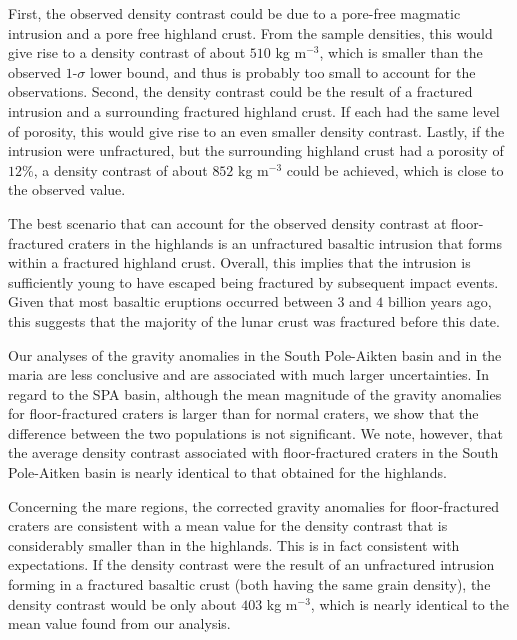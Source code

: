 First,  the observed  density contrast  could  be due  to a  pore-free
magmatic intrusion  and a  pore free highland  crust. From  the sample
densities, this would  give rise to a density contrast  of about $510$
kg m$^{-3}$,  which is  smaller than  the observed  $1$-$\sigma$ lower
bound, and thus is probably too small to account for the observations.
Second,  the density  contrast  could  be the  result  of a  fractured
intrusion and  a surrounding fractured  highland crust.  If  each had
the same  level of porosity, this  would give rise to  an even smaller
density contrast.  Lastly, if the  intrusion were unfractured, but the
surrounding  highland  crust  had  a porosity  of  $12\%$,  a  density
contrast of about $852$ kg m$^{-3}$  could be achieved, which is close
to the observed value.

The best scenario  that can account for the  observed density contrast
at floor-fractured craters in the highlands is an unfractured basaltic
intrusion that forms within a fractured highland crust.  Overall, this
implies that the intrusion is sufficiently young to have escaped being
fractured  by  subsequent impact  events.   Given  that most  basaltic
eruptions  occurred  between  $3$  and $4$  billion  years  ago,  this
suggests that  the majority  of the lunar  crust was  fractured before
this date.

Our analyses of  the gravity anomalies in the  South Pole-Aikten basin
and in  the maria  are less  conclusive and  are associated  with much
larger uncertainties.  In  regard to the SPA basin,  although the mean
magnitude  of the  gravity  anomalies for  floor-fractured craters  is
larger than  for normal craters,  we show that the  difference between
the two  populations is not  significant.  We note, however,  that the
average density  contrast associated  with floor-fractured  craters in
the South Pole-Aitken  basin is nearly identical to  that obtained for
the highlands.

Concerning  the  mare regions,  the  corrected  gravity anomalies  for
floor-fractured  craters are  consistent  with a  mean  value for  the
density contrast that  is considerably smaller than  in the highlands.
This is in fact consistent with expectations.  If the density contrast
were the  result of  an unfractured intrusion  forming in  a fractured
basaltic  crust (both  having  the same  grain  density), the  density
contrast  would be  only  about  $403$ kg  m$^{-3}$,  which is  nearly
identical to the mean value found from our analysis.

